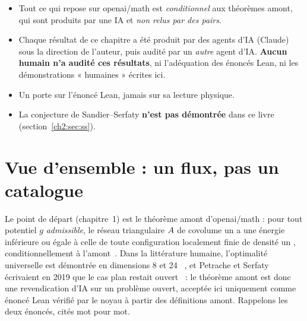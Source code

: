 \begin{warnbox}
\begin{itemize}[leftmargin=1.2em,itemsep=2pt]
\item Tout ce qui repose sur openai/math est \emph{conditionnel} aux théorèmes amont, qui sont produits par une IA et
\emph{non relus par des pairs}.
\item Chaque résultat de ce chapitre a été produit par des agents d'IA (Claude) sous la direction de l'auteur, puis
audité par un \emph{autre} agent d'IA. \textbf{Aucun humain n'a audité ces résultats}, ni l'adéquation des énoncés Lean,
ni les démonstrations « humaines » écrites ici.
\item Un \tierA{} porte sur l'énoncé Lean, jamais sur sa lecture physique.
\item La conjecture de Sandier--Serfaty \textbf{n'est pas démontrée} dans ce livre (section~\ref{ch2:sec:ss}).
\end{itemize}
\end{warnbox}

\section{Vue d'ensemble : un flux, pas un catalogue}\label{ch2:sec:flux}

Le point de départ (chapitre~1) est le théorème amont  d'openai/math : pour tout potentiel
$g$ \emph{admissible}, le réseau triangulaire $A$ de covolume un a une énergie inférieure ou égale à celle de toute
configuration localement finie de densité un \tierA{}, conditionnellement à l'amont~\cite{oai}. Dans la
littérature humaine, l'optimalité universelle est démontrée en dimensions 8 et 24~\cite{ckmrv} \tierL, et
Petrache et Serfaty écrivaient en 2019 que le cas plan restait ouvert~\cite{ch2ps} \tierL : le théorème amont est donc
une revendication d'IA sur un problème ouvert, acceptée ici uniquement comme énoncé Lean vérifié par le noyau à partir
des définitions amont. Rappelons les deux énoncés, cités mot pour mot.

